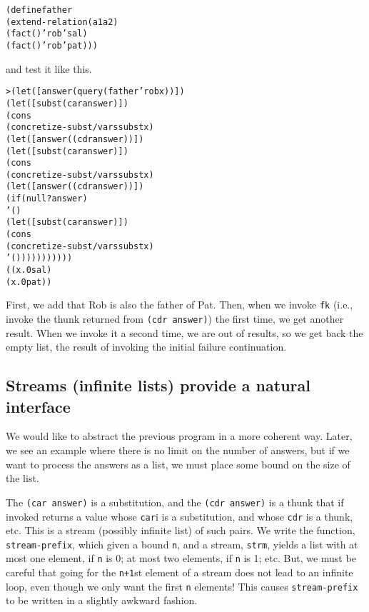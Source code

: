 \begin{alltt}
(define father
  (extend-relation (a1 a2)
    (fact () 'rob 'sal)
    (fact () 'rob 'pat)))
\end{alltt}

\noindent
and test it like this.

\begin{alltt}
> (let ([answer (query (father 'rob x))])
    (let ([subst (car answer)])
      (cons
        (concretize-subst/vars subst x)
        (let ([answer ((cdr answer))])
          (let ([subst (car answer)])
            (cons
              (concretize-subst/vars subst x)
              (let ([answer ((cdr answer))])
                (if (null? answer)
                  '()
                  (let ([subst (car answer)])
                    (cons
                      (concretize-subst/vars subst x)
                      '()))))))))))
((x.0 sal)
 (x.0 pat))
\end{alltt}
\noindent
First, we add that Rob is also the father of Pat.  Then, when we
invoke \texttt{fk} (i.e., invoke the thunk returned from \texttt{(cdr
answer)}) the first time, we get another result.  When we invoke it a
second time, we are out of results, so we get back the empty list, the
result of invoking the initial failure continuation.

\subsection{Streams (infinite lists) provide a natural interface}

We would like to abstract the previous program in a more coherent way.
Later, we see an example where there is no limit on the number of
answers, but if we want to process the answers as a list, we must
place some bound on the size of the list.

The \texttt{(car answer)} is a substitution, and the \texttt{(cdr
answer)} is a thunk that if invoked returns a value whose \texttt{car}i
is a substitution, and whose \texttt{cdr} is a thunk, etc.  This is a
stream (possibly infinite list) of such pairs.  We write the function,
\texttt{stream-prefix}, which given a bound \texttt{n}, and a stream,
\texttt{strm}, yields a list with at most one element, if \texttt{n}
is 0; at most two elements, if \texttt{n} is 1; etc.  But, we must be
careful that going for the \texttt{n+1}st element of a stream does not
lead to an infinite loop, even though we only want the first
\texttt{n} elements! This causes \texttt{stream-prefix} to be written
in a slightly awkward fashion.

